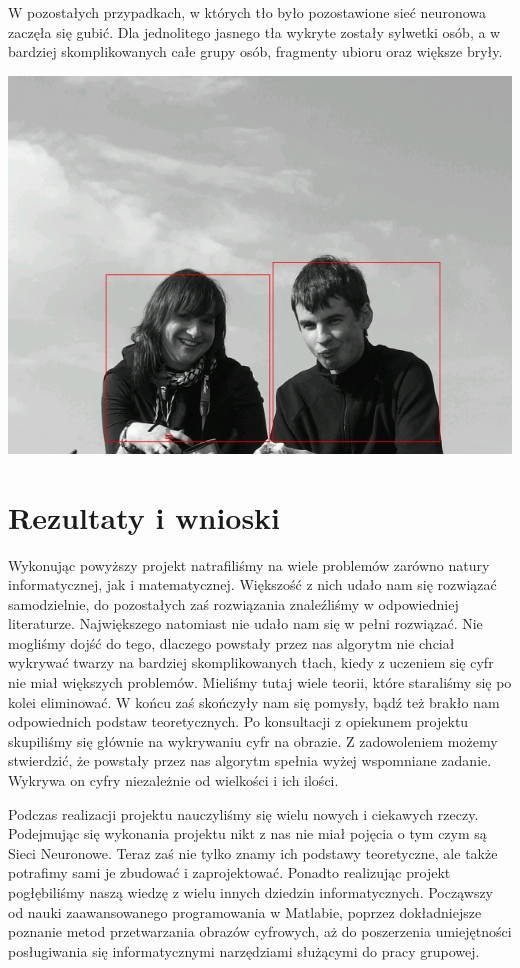 \documentclass[11pt,a4paper]{article}
\begin{document}
W pozostałych przypadkach, w których tło było pozostawione sieć neuronowa zaczęła się gubić. Dla jednolitego jasnego tła wykryte zostały sylwetki osób, a w bardziej skomplikowanych całe grupy osób, fragmenty ubioru oraz większe bryły.

\begin{center}
\includegraphics[scale=0.35]{wynik_sylwetki}
\end{center}

\newpage
\section{Rezultaty i wnioski}
Wykonując powyższy projekt natrafiliśmy na wiele problemów zarówno natury informatycznej, jak i matematycznej.
Większość z nich udało nam się rozwiązać samodzielnie, do pozostałych zaś rozwiązania znaleźliśmy w odpowiedniej
literaturze. Największego natomiast nie udało nam się w pełni rozwiązać. Nie mogliśmy dojść do tego, dlaczego
powstały przez nas algorytm nie chciał wykrywać twarzy na bardziej skomplikowanych tłach, kiedy z uczeniem się cyfr nie miał większych problemów. Mieliśmy tutaj wiele teorii, 
które staraliśmy się po kolei eliminować. W końcu zaś skończyły nam się pomysły, bądź też brakło nam odpowiednich 
podstaw teoretycznych. Po konsultacji z opiekunem projektu skupiliśmy się głównie na wykrywaniu cyfr na obrazie.
Z zadowoleniem możemy stwierdzić, że powstały przez nas algorytm  spełnia wyżej wspomniane zadanie.
Wykrywa on cyfry niezależnie od wielkości i ich ilości. 

Podczas realizacji projektu nauczyliśmy się wielu nowych i ciekawych rzeczy. Podejmując się wykonania projektu nikt
z nas nie miał pojęcia o tym czym są Sieci Neuronowe. Teraz zaś nie tylko znamy ich podstawy teoretyczne, ale także
potrafimy sami je zbudować i zaprojektować. Ponadto realizując projekt pogłębiliśmy naszą wiedzę z wielu innych dziedzin
informatycznych. Począwszy od nauki zaawansowanego programowania w Matlabie,
poprzez dokładniejsze poznanie metod przetwarzania obrazów cyfrowych, aż do poszerzenia umiejętności posługiwania się
informatycznymi narzędziami służącymi do pracy grupowej. 
\end{document}
